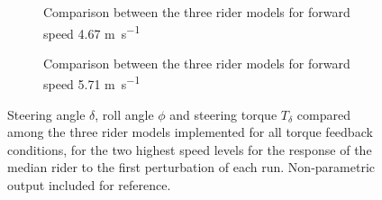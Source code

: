     \begin{figure}
        \centering
        \begin{subfigure}[b]{\textwidth}
            \centering
            \caption{Comparison between the three rider models for forward speed 4.67 \si{\meter\per\second}}
            \label{fig:results_compare3}
        \end{subfigure}
        \begin{subfigure}[b]{\textwidth}
            \centering
            \caption{Comparison between the three rider models for forward speed 5.71 \si{\meter\per\second}}            
            \label{fig:results_compare4}
        \end{subfigure}
        \caption{Steering angle \ensuremath{\delta}, roll angle \ensuremath{\phi} and steering torque \ensuremath{T_\delta} compared among the three rider models implemented for all torque feedback conditions, for the two highest speed levels for the response of the median rider to the first perturbation of each run. Non-parametric output included for reference.}
        \label{fig:results_compare34}
     \end{figure}
